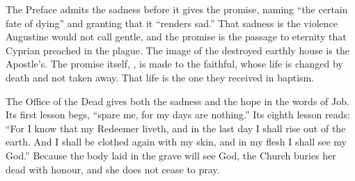\noindent The Preface admits the sadness before it gives the promise, naming ``the certain fate of dying'' and granting that it ``renders sad.'' That sadness is the violence Augustine would not call gentle, and the promise is the passage to eternity that Cyprian preached in the plague. The image of the destroyed earthly house is the Apostle's. The promise itself, , is made to the faithful, whose life is changed by death and not taken away. That life is the one they received in baptism.

The Office of the Dead gives both the sadness and the hope in the words of Job. Its first lesson begs, ``spare me, for my days are nothing.'' Its eighth lesson reads: ``For I know that my Redeemer liveth, and in the last day I shall rise out of the earth. And I shall be clothed again with my skin, and in my flesh I shall see my God.'' Because the body laid in the grave will see God, the Church buries her dead with honour, and she does not cease to pray.
